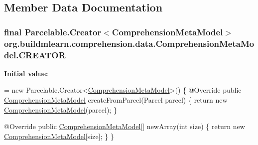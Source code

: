 \subsection{Member Data Documentation}
\subsubsection[{\texorpdfstring{C\+R\+E\+A\+T\+OR}{CREATOR}}]{\setlength{\rightskip}{0pt plus 5cm}final Parcelable.\+Creator$<${\bf Comprehension\+Meta\+Model}$>$ org.\+buildmlearn.\+comprehension.\+data.\+Comprehension\+Meta\+Model.\+C\+R\+E\+A\+T\+OR}\hypertarget{classorg_1_1buildmlearn_1_1comprehension_1_1data_1_1ComprehensionMetaModel_a5f2b2b04f3324bbeec1d443f03291383}{}\label{classorg_1_1buildmlearn_1_1comprehension_1_1data_1_1ComprehensionMetaModel_a5f2b2b04f3324bbeec1d443f03291383}
{\bfseries Initial value\+:}
\begin{DoxyCode}
= \textcolor{keyword}{new} Parcelable.Creator<\hyperlink{classorg_1_1buildmlearn_1_1comprehension_1_1data_1_1ComprehensionMetaModel_a699e7a68c922085b1dfbbc99d4e90340}{ComprehensionMetaModel}>() \{
        @Override
        \textcolor{keyword}{public} \hyperlink{classorg_1_1buildmlearn_1_1comprehension_1_1data_1_1ComprehensionMetaModel_a699e7a68c922085b1dfbbc99d4e90340}{ComprehensionMetaModel} createFromParcel(Parcel parcel) \{
            \textcolor{keywordflow}{return} \textcolor{keyword}{new} \hyperlink{classorg_1_1buildmlearn_1_1comprehension_1_1data_1_1ComprehensionMetaModel_a699e7a68c922085b1dfbbc99d4e90340}{ComprehensionMetaModel}(parcel);
        \}

        @Override
        \textcolor{keyword}{public} \hyperlink{classorg_1_1buildmlearn_1_1comprehension_1_1data_1_1ComprehensionMetaModel_a699e7a68c922085b1dfbbc99d4e90340}{ComprehensionMetaModel}[] newArray(\textcolor{keywordtype}{int} size) \{
            \textcolor{keywordflow}{return} \textcolor{keyword}{new} \hyperlink{classorg_1_1buildmlearn_1_1comprehension_1_1data_1_1ComprehensionMetaModel_a699e7a68c922085b1dfbbc99d4e90340}{ComprehensionMetaModel}[size];
        \}
    \}
\end{DoxyCode}
